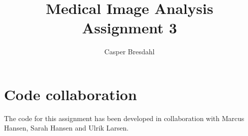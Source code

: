 \documentclass[runningheads]{llncs}
\begin{document}
%
\title{Medical Image Analysis Assignment 3}
%
%
\author{Casper Bresdahl}
%
%
%
\maketitle              %
%







\newpage
%
%
%
% 
% 
%
%
%
\section{Code collaboration}
The code for this assignment has been developed in collaboration with Marcus Hansen, Sarah Hansen and Ulrik Larsen.
\end{document}
